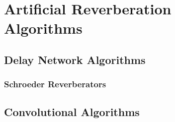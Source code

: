 \chapter{Artificial Reverberation Algorithms}
\section{Delay Network Algorithms}
\subsection{Schroeder Reverberators}
\section{Convolutional Algorithms}
